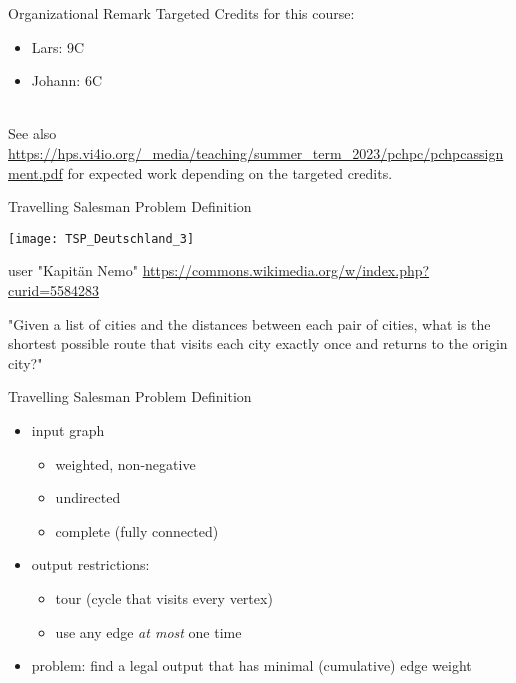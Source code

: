 \begin{frame}{Organizational Remark}
  Targeted Credits for this course:
  \begin{itemize}
    \item Lars: 9C
    \item Johann: 6C
  \end{itemize}
~\\
  See also \url{https://hps.vi4io.org/_media/teaching/summer_term_2023/pchpc/pchpcassignment.pdf}
  for expected work depending on the targeted credits.
\end{frame}

\begin{frame}{Travelling Salesman Problem Definition}
\begin{minipage}{0.45\textwidth}
  \texttt{[image: TSP\_Deutschland\_3]}
  \tiny

  user "Kapitän Nemo" \url{https://commons.wikimedia.org/w/index.php?curid=5584283}
\end{minipage}
\begin{minipage}{0.45\textwidth}

"Given a list of cities and the distances between each pair of cities, what is the shortest possible route that visits each city exactly once and returns to the origin city?"
\cite{song_solving_2021}
\end{minipage}
\end{frame}

\begin{frame}{Travelling Salesman Problem Definition}
  \begin{itemize}
    \item input graph
      \begin{itemize}
        \item weighted, non-negative
        \item undirected
        \item complete (fully connected)
      \end{itemize}

    \pause
    \item output restrictions:
      \begin{itemize}
        \item tour (cycle that visits every vertex)
        \item use any edge \emph{at most} one time
      \end{itemize}
    \pause
    \item problem: find a legal output that has minimal (cumulative) edge weight
  \end{itemize}
\end{frame}

